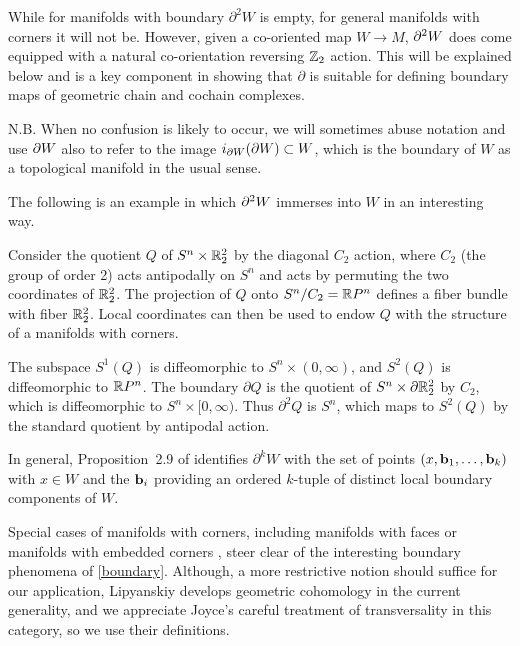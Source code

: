 \begin{remark}
While for manifolds with boundary $\partial^2W$ is empty, for general manifolds with corners it will not be.
However, given a co-oriented map $W\to M$, $\partial^2W$ does come equipped with a natural co-orientation reversing $\mathbb{Z}_2$ action.
This will be explained below and is a key component in showing that $\partial$ is suitable for defining boundary maps of geometric chain and cochain complexes.

N.B.
When no confusion is likely to occur, we will sometimes abuse notation and use $\partial W$ also to refer to the image $i_{\partial W}(\partial W)\subset W$, which is the boundary of $W$ as a topological manifold in the usual sense.

The following is an example in which $\partial^2 W$ immerses into $W$ in an interesting way.

\begin{example} \label{boundary}
	Consider the quotient $Q$ of $S^n \times \mathbb{R}^2_2$ by the diagonal $C_2$ action, where $C_2$ (the group of order 2) acts antipodally on $S^n$ and acts by permuting the two coordinates
	of $\mathbb{R}^2_2$.
	The projection of $Q$ onto $S^n / C_2 = \mathbb{R} P^n$ defines a fiber bundle with fiber $\mathbb{R}^2_2$.
	Local coordinates can then be used to endow $Q$ with the structure of a manifolds with corners.

	The subspace $S^1(Q)$ is diffeomorphic to $S^n \times (0,\infty)$, and $S^2(Q)$ is diffeomorphic to $\mathbb{R} P^n$.
	The boundary $\partial Q$ is the quotient of $S^n \times \partial \mathbb{R}^2_2$ by $C_2$, which is diffeomorphic to
	$S^n \times [0,\infty)$.
	Thus $\partial^2 Q$ is $S^n$, which maps to $S^2(Q)$ by the standard quotient by antipodal action.
\end{example}

In general, Proposition~2.9 of \cite{Joy12} identifies $\partial^k W$ with the set of points $(x,\mathbf{b}_1,\ldots,\mathbf{b}_k)$ with $x\in W$ and the $\mathbf{b}_i$ providing an ordered $k$-tuple of distinct local boundary components of $W$.

Special cases of manifolds with corners, including
manifolds with faces or manifolds with embedded corners \cite{Joy12}, steer clear of the interesting boundary phenomena of \cref{boundary}.
Although, a more restrictive notion should suffice for our application, Lipyanskiy develops geometric cohomology in the current generality, and we appreciate Joyce's careful treatment of transversality in this category, so we use their definitions.


\end{remark}
